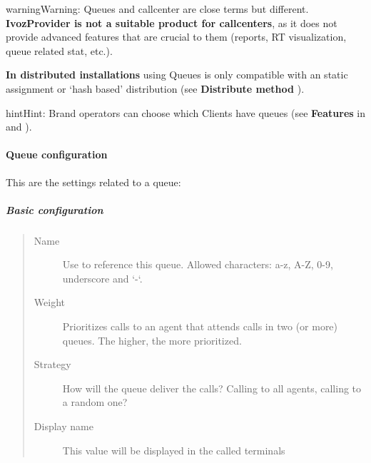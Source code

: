 \documentclass[letterpaper,10pt,english]{sphinxmanual}
\begin{document}
\begin{notice}{warning}{Warning:}
Queues and callcenter are close terms but different. \textbf{IvozProvider
is not a suitable product for callcenters}, as it does not provide
advanced features that are crucial to them (reports, RT visualization,
queue related stat, etc.).
\end{notice}

\textbf{In distributed installations} using Queues is only compatible with an static
assignment or `hash based' distribution (see \textbf{Distribute method} {\hyperref[administration_portal/brand/clients/virtual_pbx:virtual\string-pbx]{}}).

\begin{notice}{hint}{Hint:}
Brand operators can choose which Clients have queues (see \textbf{Features}
in {\hyperref[getting_started/internal_calls/brand_portal:brand\string-configuration]{}} and {\hyperref[getting_started/internal_calls/client_portal:client\string-configuration]{}}).
\end{notice}


\paragraph{Queue configuration}
\label{administration_portal/client/vpbx/routing_endpoints/queues:queue-configuration}
This are the settings related to a queue:


\subparagraph{Basic configuration}
\label{administration_portal/client/vpbx/routing_endpoints/queues:basic-configuration}\begin{quote}
\begin{description}
\item[{Name}] \leavevmode
Use to reference this queue. Allowed characters: a-z, A-Z, 0-9, underscore and `-`.

\item[{Weight}] \leavevmode
Prioritizes calls to an agent that attends calls in two (or more) queues. The
higher, the more prioritized.

\item[{Strategy}] \leavevmode
How will the queue deliver the calls? Calling to all agents, calling to a
random one?

\item[{Display name}] \leavevmode
This value will be displayed in the called terminals

\end{description}
\end{quote}
\end{document}
